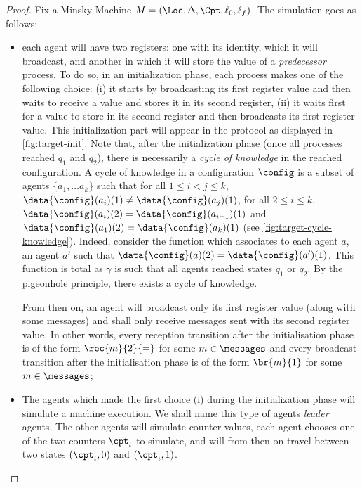 \begin{proof}
	
	
	
	Fix a Minsky Machine $M= (\Loc, \Delta, \Cpt, \ell_0, \ell_f)$. The simulation goes as follows: 
	\begin{itemize}
		\item each agent will have two registers: one with its identity, which it will broadcast, and another in which it will store the value of a \emph{predecessor} process. To do so, in an initialization phase, each process makes one of the following choice: (i) it starts by broadcasting its first register value and then waits to receive a value and stores it in its second register, (ii) it waits first for a value to store in its second register and then broadcasts its first register value. This initialization part will appear in the protocol as displayed in \cref{fig:target-init}. Note that, after the initialization phase (once all processes reached $q_1$ and $q_2$), there is necessarily a \emph{cycle of knowledge} in the reached configuration. A cycle of knowledge in a configuration $\config$ is a subset of agents $\{a_1, \dots a_k\}$ such that for all $1 \leq i < j \leq k$, $\data{\config}(a_i)(1) \ne \data{\config}(a_j)(1)$, for all $2 \leq i \leq k$, $\data{\config}(a_i)(2) = \data{\config}(a_{i-1})(1)$ and $\data{\config}(a_1)(2) = \data{\config}(a_{k})(1)$ (see \cref{fig:target-cycle-knowledge}). Indeed, consider the function which associates to each agent $a$, an agent $a'$ such that $\data{\config}(a)(2) = \data{\config}(a')(1)$. This function is total as $\gamma$ is such that all agents reached states $q_1$ or $q_2$. By the pigeonhole principle, there exists a cycle of knowledge.
		
		From then on, an agent will broadcast only its first register value (along with some messages) and shall only receive messages sent with its second register value. In other words, every reception transition after the initialisation phase is of the form $\rec{m}{2}{=}$ for some $m \in \messages$ and every broadcast transition after the initialisation  phase is of the form $\br{m}{1}$ for some $m \in \messages$;
		
		\item The agents which made the first choice (i) during the initialization phase will simulate a machine execution. We shall name this type of agents \emph{leader} agents.  
		The other agents will simulate counter values, each agent chooses one of the two counters $\cpt_i$ to simulate, and will from then on travel between two states $(\cpt_i, 0)$ and $(\cpt_i, 1)$.
		

\end{itemize}
\end{proof}

